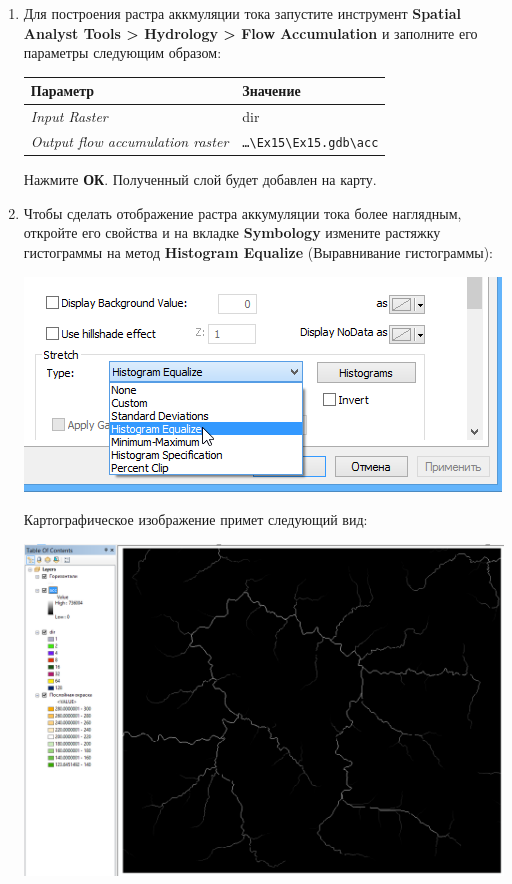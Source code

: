 \documentclass[12pt,]{book}
\begin{document}
\begin{enumerate}
\def\labelenumi{\arabic{enumi}.}
\item
  Для построения растра аккмуляции тока запустите инструмент \textbf{Spatial Analyst Tools \textgreater{} Hydrology \textgreater{} Flow Accumulation} и заполните его параметры следующим образом:

  \begin{longtable}[]{@{}ll@{}}
  \toprule
  Параметр & Значение\tabularnewline
  \midrule
  \endhead
  \emph{Input Raster} & dir\tabularnewline
  \emph{Output flow accumulation raster} & \texttt{\ldots{}\textbackslash{}Ex15\textbackslash{}Ex15.gdb\textbackslash{}acc}\tabularnewline
  \bottomrule
  \end{longtable}

  Нажмите \textbf{ОК}. Полученный слой будет добавлен на карту.
\item
  Чтобы сделать отображение растра аккумуляции тока более наглядным, откройте его свойства и на вкладке \textbf{Symbology} измените растяжку гистограммы на метод \textbf{Histogram Equalize} (Выравнивание гистограммы):

  \includegraphics{images/Ex15/image12.png}

  Картографическое изображение примет следующий вид:

  \includegraphics{images/Ex15/image13.png}
\end{enumerate}
\end{document}
